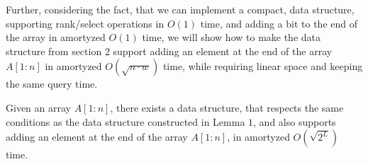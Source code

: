 \documentclass[runningheads]{llncs}
\begin{document}
Further, considering the fact, that we can implement a compact, data structure, supporting rank/select operations in $O(1)$ time, and adding a bit to the 
end of the array in amortyzed $O(1)$ time, we will show how to make the data structure from section $2$ support adding an element at the end of the 
array $A[1:n]$ in amortyzed $O(\sqrt {n \cdot w} )$ time, while requiring linear space and keeping the same query time.



\begin{lemma}
    Given an array $A[1:n]$, there exists a data structure, that respects the same conditions as the data structure constructed in 
    Lemma $1$, and also supports adding an element at the end of the array $A[1:n]$, in amortyzed $O(\sqrt{2^L})$ time.

\end{lemma}
\end{document}
